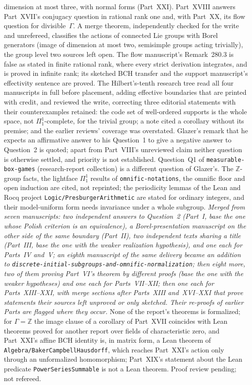 \documentclass[11pt]{article}
\newcommand{\dir}[1]{\texttt{#1}}
\newcommand{\Z}{\mathbb{Z}}
\begin{document}
{dimension at most three, with normal forms (Part~XXI).  Part~XVIII answers
Part~XVII's conjugacy question in rational rank one and, with Part~XX, its
flow question for divisible~$\Gamma$.  A merge theorem, independently checked for the
write and unrefereed, classifies the actions of connected Lie groups with
Borel generators (image of dimension at most two, semisimple groups acting
trivially), the group level two sources left open.  The flow manuscript's
Remark~280.3 is false as stated in finite rational rank, where every strict
derivation integrates, and is proved in infinite rank; its sketched BCH
transfer and the support manuscript's effectivity sentence are proved.
The Hilbert's-tenth research tree read all four manuscripts in full before
placement, adding effective boundaries that are printed with credit, and
reviewed the write, correcting three editorial statements with their
counterexamples retained: the code set of well-ordered supports is the
whole space, not $\Pi^1_1$-complete, for the trivial group; a note cited a
corollary without its premise; and the earlier reviews' coverage was
overstated.  Glazer's remark that he
expects an affirmative answer to his Question~1 to give a negative answer
to Question~2 is quoted; apart from Part~VIII's unreviewed claim neither
question is otherwise settled, and priority is not established.
Question~Q1 of \dir{measurable-box-games} (research-report collection) is
a different question of Glazer's.  The
$\Z$-group facts, the lightface $\Pi^1_1$ results of
\dir{omnific-notations}, the omnific floor and open induction are cited, not
reprinted; the periodicity lemmas of the Lean and Rocq project
\dir{Logic/PresburgerArithmetic} are stated for ordinary integers, and
their model-uniform form needs invariance under a whole subgroup.
\emph{Merged from seven manuscripts: two independent answers to
Question~2 (Part~I, base the one whose Polish criterion is an equivalence),
a Borel-presentation manuscript on the other side of the same boundary
(Part~II), two independent texts sharing a title (Part~III, base the one
with the weaker realization hypothesis), and one each for Parts~IV and~V;
an eighth manuscript of the same delivery became an addition to
\dir{discrete-initial-subgroups-and-omnific-normalization}; then eight
more, two of them proving Part~VI's theorem by different proofs (base the
one with the weaker hypotheses) and one each for Parts~VII--XII; then one
each for Parts~XIII--XXI, with merge sections after Parts~XIII
and~XVI--XXI that prove statements their sources left unproved or only
sketched.  Their
re-proofs of earlier Parts are flagged where they occur.}
None of the report's theorems is formalized; for $\Gamma=\Z$ the image
clause of a corollary of Part~XVII coincides with Lean theorems proved for
another report over fields of characteristic zero, and Part~XXI's affine
BCH identity is, in matrix form, a Lean theorem of
\dir{Algebra/BakerCampbellHausdorff}, which reaches Part~XXI's action only
through an unformalized homomorphism; Part~XIX's statement about the Lean
predicate \texttt{PowerSeriesSummable} is not a Lean theorem.  Proof review
pending; not refereed.}
\end{document}
